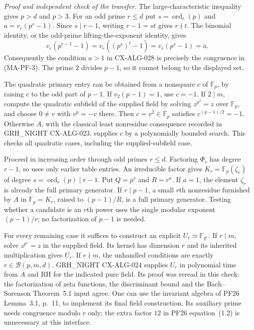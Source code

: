 \emph{Proof and independent check of the transfer.}
The large-characteristic inequality gives $p>d$ and $p>3$. For an odd
prime $r\le d$ put $s=\operatorname{ord}_r(p)$ and
$a=v_r(p^s-1)$. Since $s\mid r-1$, writing $r-1=st$ gives
$r\nmid t$. The binomial identity, or the odd-prime lifting-the-exponent
identity, gives
\[
 v_r(p^{r-1}-1)=v_r((p^s)^t-1)=v_r(p^s-1)=a.
\]
Consequently the condition $a>1$ in CX-ALG-028 is precisely the
congruence in (MA-PF-3). The prime $2$ divides $p-1$, so it cannot
belong to the displayed set.

The quadratic primary entry can be obtained from a nonsquare $c$ of
$\mathbb F_p$, by raising $c$ to the odd part of $p-1$. If
$v_2(p-1)=1$, use $c=-1$. If $2\mid m$, compute the quadratic
subfield of the supplied field by solving $z^{p^2}=z$ over
$\mathbb F_p$, and choose $0\ne v$ with $v^p=-v$ there. Then
$c=v^2\in\mathbb F_p$ satisfies $c^{(p-1)/2}=-1$. Otherwise
$A$, with the classical least nonresidue consequence recorded in
GRH\_NIGHT CX-ALG-023, supplies $c$ by a polynomially bounded search.
This checks all quadratic cases, including the supplied-subfield case.

Proceed in increasing order through odd primes $r\le d$. Factoring
$\Phi_r$ has degree $r-1$, so uses only earlier table entries. An
irreducible factor gives
$K_r=\mathbb F_p(\zeta_r)$ of degree
$s=\operatorname{ord}_r(p)\mid r-1$. Put $Q=p^s$ and $R=r^a$.
If $a=1$, the element $\zeta_r$ is already the full primary
generator. If $r\mid p-1$, a small $r$th nonresidue furnished by
$A$ in $\mathbb F_p=K_r$, raised to $(p-1)/R$, is a full primary
generator. Testing whether a candidate is an $r$th power uses the
single modular exponent $(p-1)/r$; no factorization of $p-1$ is needed.

For every remaining case it suffices to construct an explicit
$U_r\simeq\mathbb F_{p^r}$. If $r\mid m$, solve
$z^{p^r}=z$ in the supplied field. Its kernel has dimension $r$ and
its inherited multiplication gives $U_r$. If $r\nmid m$, the
unhandled conditions are exactly $r\in\mathcal B(p,m,d)$.
GRH\_NIGHT CX-ALG-024 supplies $U_r$ in polynomial time from $A$
and RH for the indicated pure field. Its proof was reread in this
check: the factorization of zeta functions, the discriminant bound and
the Bach--Sorenson Theorem~5.1 input agree. One can use the invariant
algebra of PF26 Lemma~3.1, p.~11, to implement its final field
construction. Its auxiliary prime needs congruence modulo $r$ only;
the extra factor $12$ in PF26 equation~(1.2) is unnecessary at this
interface.

